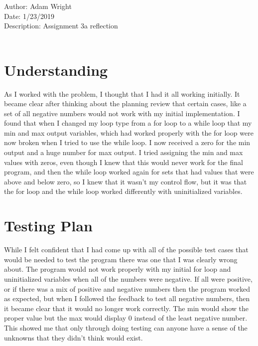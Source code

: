 \documentclass{article}
\begin{document}
	
Author:            Adam Wright\\

Date:              1/23/2019\\

Description:       Assignment 3a reflection\\ \\

\section*{Understanding}
As I worked with the problem, I thought that I had it all working initially. It became clear after thinking about the planning review that certain cases, like a set of all negative numbers would not work with my initial implementation. I found that when I changed my loop type from a for loop to a while loop that my min and max output variables, which had worked properly with the for loop were now broken when I tried to use the while loop. I now received a zero for the min output and a huge number for max output. I tried assigning the min and max values with zeros, even though I knew that this would never work for the final program, and then the while loop worked again for sets that had values that were above and below zero, so I knew that it wasn't my control flow, but it was that the for loop and the while loop worked differently with uninitialized variables.
\section*{Testing Plan}
While I felt confident that I had come up with all of the possible test cases that would be needed to test the program there was one that I was clearly wrong about. The program would not work properly with my initial for loop and uninitialized variables when all of the numbers were negative. If all were positive, or if there was a mix of positive and negative numbers then the program worked as expected, but when I followed the feedback to test all negative numbers, then it became clear that it would no longer work correctly. The min would show the proper value but the max would display 0 instead of the least negative number. This showed me that only through doing testing can anyone have a sense of the unknowns that they didn't think would exist.\\
\end{document}
